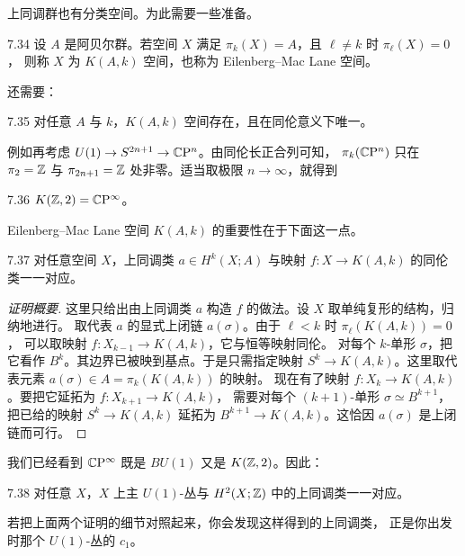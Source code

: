 上同调群也有分类空间。为此需要一些准备。

\begin{definition}{7.34}
设 $A$ 是阿贝尔群。若空间 $X$ 满足 $\pi_k(X)=A$，且 $\ell\neq k$ 时 $\pi_\ell(X)=0$，
则称 $X$ 为 $K(A,k)$ 空间，也称为 Eilenberg--Mac Lane 空间。
\end{definition}

还需要：

\begin{theorem}{7.35}
对任意 $A$ 与 $k$，$K(A,k)$ 空间存在，且在同伦意义下唯一。
\end{theorem}

例如再考虑 $U(1)\to S^{2n+1}\to\mathbb{C}\mathrm{P}^n$。由同伦长正合列可知，
$\pi_k(\mathbb{C}\mathrm{P}^n)$ 只在 $\pi_2=\mathbb{Z}$ 与 $\pi_{2n+1}=\mathbb{Z}$ 处非零。适当取极限 $n\to\infty$，就得到

\begin{example}{7.36}
$K(\mathbb{Z},2)=\mathbb{C}\mathrm{P}^\infty$。
\end{example}

Eilenberg--Mac Lane 空间 $K(A,k)$ 的重要性在于下面这一点。

\begin{theorem}{7.37}
对任意空间 $X$，上同调类 $a\in H^k(X;A)$ 与映射 $f:X\to K(A,k)$ 的同伦类一一对应。
\end{theorem}

\begin{proof}[证明概要]
这里只给出由上同调类 $a$ 构造 $f$ 的做法。设 $X$ 取单纯复形的结构，归纳地进行。
取代表 $a$ 的显式上闭链 $a(\sigma)$。由于 $\ell<k$ 时 $\pi_\ell(K(A,k))=0$，
可以取映射 $f:X_{k-1}\to K(A,k)$，它与恒等映射同伦。
对每个 $k$-单形 $\sigma$，把它看作 $B^k$。其边界已被映到基点。于是只需指定映射
$S^k\to K(A,k)$。这里取代表元素 $a(\sigma)\in A=\pi_k(K(A,k))$ 的映射。
现在有了映射 $f:X_k\to K(A,k)$。要把它延拓为 $f:X_{k+1}\to K(A,k)$，
需要对每个 $(k+1)$-单形 $\sigma\simeq B^{k+1}$，把已给的映射 $S^k\to K(A,k)$
延拓为 $B^{k+1}\to K(A,k)$。这恰因 $a(\sigma)$ 是上闭链而可行。
\end{proof}

我们已经看到 $\mathbb{C}\mathrm{P}^\infty$ 既是 $BU(1)$ 又是 $K(\mathbb{Z},2)$。因此：

\begin{theorem}{7.38}
对任意 $X$，$X$ 上主 $U(1)$-丛与 $H^2(X;\mathbb{Z})$ 中的上同调类一一对应。
\end{theorem}

若把上面两个证明的细节对照起来，你会发现这样得到的上同调类，
正是你出发时那个 $U(1)$-丛的 $c_1$。

